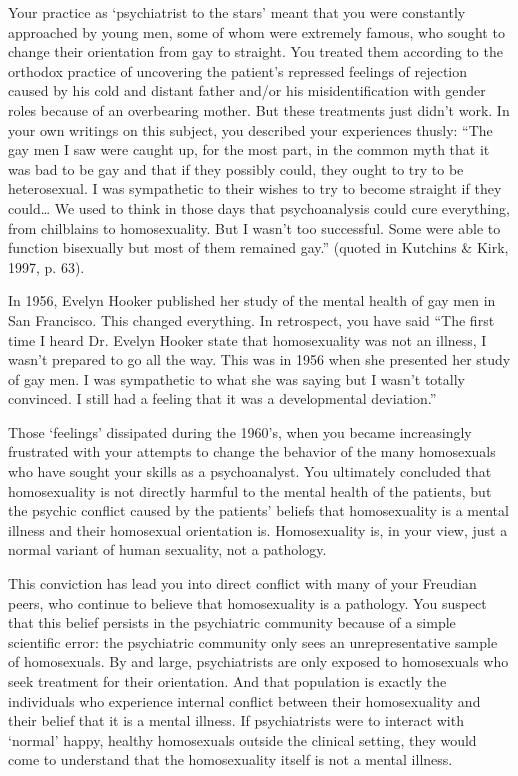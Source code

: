 \begin{refsection}
Your practice as `psychiatrist to the stars' meant that you were constantly approached by young men, some of whom were extremely famous, who sought to change their orientation from gay to straight. You treated them according to the orthodox practice of uncovering the patient's repressed feelings of rejection caused by his cold and distant father and\slash or his misidentification with gender roles because of an overbearing mother. But these treatments just didn't work. In your own writings on this subject, you described your experiences thusly: “The gay men I saw were caught up, for the most part, in the common myth that it was bad to be gay and that if they possibly could, they ought to try to be heterosexual. I was sympathetic to their wishes to try to become straight if they could{\ldots} We used to think in those days that psychoanalysis could cure everything, from chilblains to homosexuality. But I wasn't too successful. Some were able to function bisexually but most of them remained gay.” (quoted in Kutchins \& Kirk, 1997, p. 63).

In 1956, Evelyn Hooker published her study of the mental health of gay men in San Francisco. This changed everything. In retrospect, you have said “The first time I heard Dr. Evelyn Hooker state that homosexuality was not an illness, I wasn't prepared to go all the way. This was in 1956 when she presented her study of gay men. I was sympathetic to what she was saying but I wasn't totally convinced. I still had a feeling that it was a developmental deviation.”

Those `feelings' dissipated during the 1960's, when you became increasingly frustrated with your attempts to change the behavior of the many homosexuals who have sought your skills as a psychoanalyst. You ultimately concluded that homosexuality is not directly harmful to the mental health of the patients, but the psychic conflict caused by the patients' beliefs that homosexuality is a mental illness and their homosexual orientation is. Homosexuality is, in your view, just a normal variant of human sexuality, not a pathology.

This conviction has lead you into direct conflict with many of your Freudian peers, who continue to believe that homosexuality is a pathology. You suspect that this belief persists in the psychiatric community because of a simple scientific error: the psychiatric community only sees an unrepresentative sample of homosexuals. By and large, psychiatrists are only exposed to homosexuals who seek treatment for their orientation. And that population is exactly the individuals who experience internal conflict between their homosexuality and their belief that it is a mental illness. If psychiatrists were to interact with `normal' happy, healthy homosexuals outside the clinical setting, they would come to understand that the homosexuality itself is not a mental illness.


\end{refsection}
